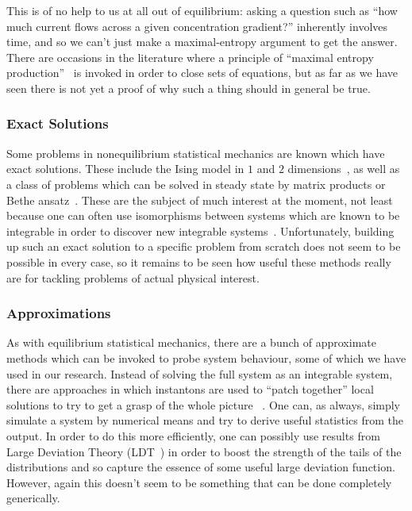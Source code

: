 This is of no help to us at all out of equilibrium: asking a question such as
``how much current flows across a given concentration gradient?'' inherently involves time, and so
we can't just make a maximal-entropy argument to get the answer. There are occasions in the 
literature where a principle of ``maximal entropy production''~\cite{dewar2005, martyushev2006}
is invoked in order to close sets of
equations, but as far as we have seen there is not yet a proof of why such a thing should in
general be true.


\subsubsection{Exact Solutions}
Some problems in nonequilibrium statistical mechanics are known which have exact solutions. 
These include the Ising model in $1$ and $2$ dimensions~\cite{brush1967}, as well as a class of problems which can be
solved in steady state by matrix products or Bethe ansatz~\cite{van2016}. 
These are the subject of much
interest at the
moment, not least because one can often use isomorphisms between systems which are known to
be integrable in order to discover new integrable systems~\cite{Rota1989}.
Unfortunately, building up such an exact solution to a specific problem from scratch does not seem to be possible in every case,
so it remains to be seen how useful these methods really are for tackling problems of actual
physical interest.


\subsubsection{Approximations}
As with equilibrium statistical mechanics, there are a bunch of approximate methods which can
be invoked to probe system behaviour, some of which we have used in our research.
Instead of solving the full system as an integrable system, there are approaches in which instantons
are used to ``patch together'' local solutions to try to get a grasp of the whole picture
~\cite{wallace1978}. One can,
as always, simply simulate a system by numerical means and try to derive useful statistics from the
output. In order to do this more efficiently, one can possibly use results from Large Deviation
Theory (LDT~\cite{touchette2011}) in order to boost the strength of the tails of the distributions and so capture the essence
of some useful large deviation function. However, again this doesn't seem to be something that can
be done completely generically.

